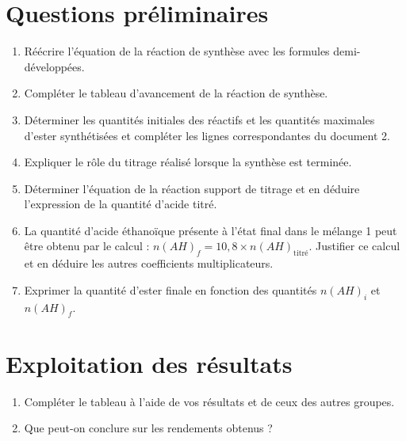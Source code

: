 \documentclass[a4paper,11pt,fleqn]{article}%
\begin{document}
\section*{Questions préliminaires}
\begin{enumerate}
	\item Réécrire l'équation de la réaction de synthèse avec les formules demi-développées.
	\item Compléter le tableau d'avancement de la réaction de synthèse.
	\item Déterminer les quantités initiales des réactifs et les quantités maximales d'ester synthétisées et compléter les lignes correspondantes du document 2.
	\item Expliquer le rôle du titrage réalisé lorsque la synthèse est terminée.
	\item Déterminer l'équation de la réaction support de titrage et en déduire l'expression de la quantité d'acide titré.
	\item La quantité d'acide éthanoïque présente à l'état final dans le mélange 1 peut être obtenu par le calcul : $n(AH)_f = 10,8 \times n(AH)_{\text{titré}}$. Justifier ce calcul et en déduire les autres coefficients multiplicateurs.
	\item Exprimer la quantité d'ester finale en fonction des quantités $n(AH)_i$ et $n(AH)_f$.
\end{enumerate}
\section*{Exploitation des résultats}
\begin{enumerate}[resume]
	\item Compléter le tableau à l'aide de vos résultats et de ceux des autres groupes.
	\item Que peut-on conclure sur les rendements obtenus ?
\end{enumerate}
\end{document}
